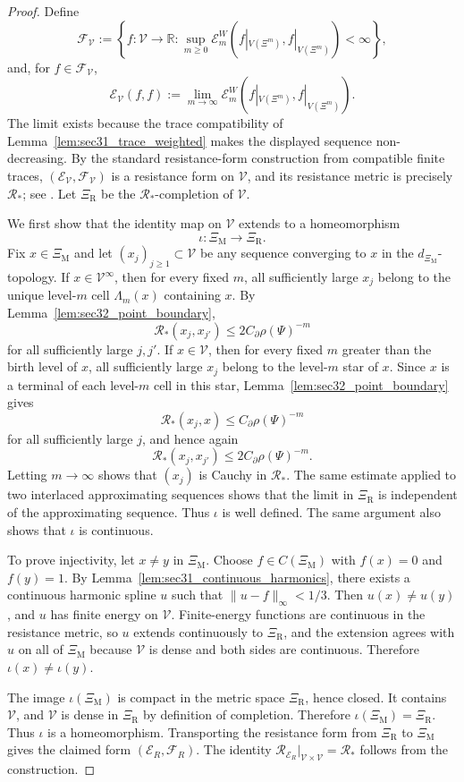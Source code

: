 \documentclass{article}
\theoremstyle{plain}
\theoremstyle{definition}
\newcommand{\Reff}{\mathscr{R}}
\begin{document}
\begin{proof}
Define
\[
\mathcal F_{\mathscr V}:=
\left\{
 f:\mathscr V\to\mathbb R:
 \sup_{m\ge 0}\mathcal E_m^W(f|_{V(\Xi^m)},f|_{V(\Xi^m)})<\infty
\right\},
\]
and, for $f\in\mathcal F_{\mathscr V}$,
\[
\mathcal E_{\mathscr V}(f,f):=
\lim_{m\to\infty}
\mathcal E_m^W(f|_{V(\Xi^m)},f|_{V(\Xi^m)}).
\]
The limit exists because the trace compatibility of Lemma~\ref{lem:sec31_trace_weighted} makes the displayed sequence non-decreasing.
By the standard resistance-form construction from compatible finite traces, $(\mathcal E_{\mathscr V},\mathcal F_{\mathscr V})$ is a resistance form on $\mathscr V$, and its resistance metric is precisely $\Reff_*$; see \cite{kigami2001analysis}.
Let $\Xi_{\mathrm R}$ be the $\Reff_*$-completion of $\mathscr V$.

We first show that the identity map on $\mathscr V$ extends to a homeomorphism
\[
\iota:\Xi_{\mathrm M}\longrightarrow \Xi_{\mathrm R}.
\]
Fix $x\in\Xi_{\mathrm M}$ and let $(x_j)_{j\ge 1}\subset\mathscr V$ be any sequence converging to $x$ in the $d_{\Xi_{\mathrm M}}$-topology.
If $x\in\mathscr V^\infty$, then for every fixed $m$, all sufficiently large $x_j$ belong to the unique level-$m$ cell $\Lambda_m(x)$ containing $x$.
By Lemma~\ref{lem:sec32_point_boundary},
\[
\Reff_*(x_j,x_{j'})\le 2C_\partial\rho(\Psi)^{-m}
\]
for all sufficiently large $j,j'$.
If $x\in\mathscr V$, then for every fixed $m$ greater than the birth level of $x$, all sufficiently large $x_j$ belong to the level-$m$ star of $x$.
Since $x$ is a terminal of each level-$m$ cell in this star, Lemma~\ref{lem:sec32_point_boundary} gives
\[
\Reff_*(x_j,x)\le C_\partial\rho(\Psi)^{-m}
\]
for all sufficiently large $j$, and hence again
\[
\Reff_*(x_j,x_{j'})\le 2C_\partial\rho(\Psi)^{-m}.
\]
Letting $m\to\infty$ shows that $(x_j)$ is Cauchy in $\Reff_*$.
The same estimate applied to two interlaced approximating sequences shows that the limit in $\Xi_{\mathrm R}$ is independent of the approximating sequence.
Thus $\iota$ is well defined.
The same argument also shows that $\iota$ is continuous.

To prove injectivity, let $x\ne y$ in $\Xi_{\mathrm M}$.
Choose $f\in C(\Xi_{\mathrm M})$ with $f(x)=0$ and $f(y)=1$.
By Lemma~\ref{lem:sec31_continuous_harmonics}, there exists a continuous harmonic spline $u$ such that $\|u-f\|_\infty<1/3$.
Then $u(x)\ne u(y)$, and $u$ has finite energy on $\mathscr V$.
Finite-energy functions are continuous in the resistance metric, so $u$ extends continuously to $\Xi_{\mathrm R}$, and the extension agrees with $u$ on all of $\Xi_{\mathrm M}$ because $\mathscr V$ is dense and both sides are continuous.
Therefore $\iota(x)\ne\iota(y)$.

The image $\iota(\Xi_{\mathrm M})$ is compact in the metric space $\Xi_{\mathrm R}$, hence closed.
It contains $\mathscr V$, and $\mathscr V$ is dense in $\Xi_{\mathrm R}$ by definition of completion.
Therefore $\iota(\Xi_{\mathrm M})=\Xi_{\mathrm R}$.
Thus $\iota$ is a homeomorphism.
Transporting the resistance form from $\Xi_{\mathrm R}$ to $\Xi_{\mathrm M}$ gives the claimed form $(\mathcal E_R,\mathcal F_R)$.
The identity $\Reff_{\mathcal E_R}|_{\mathscr V\times\mathscr V}=\Reff_*$ follows from the construction.
\end{proof}
\end{document}
